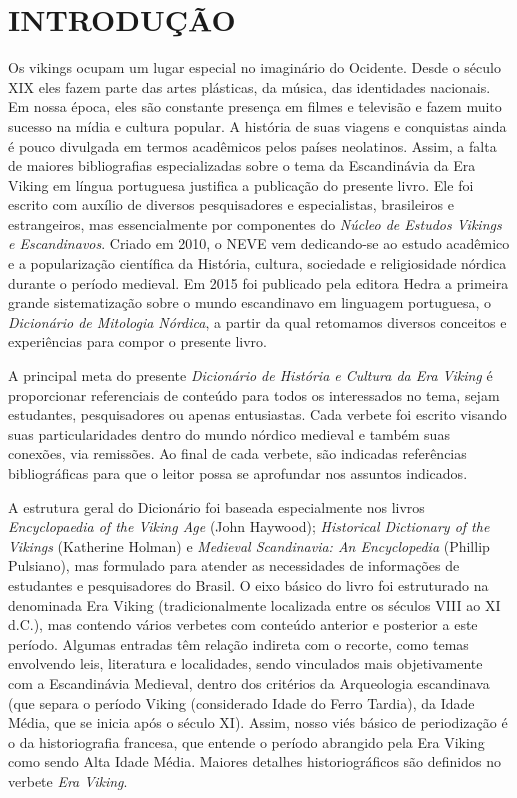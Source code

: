 


\chapter{INTRODUÇÃO}\label{introduuxe7uxe3o}

Os vikings ocupam um lugar especial no imaginário do Ocidente. Desde o
século XIX eles fazem parte das artes plásticas, da música, das
identidades nacionais. Em nossa época, eles são constante presença em
filmes e televisão e fazem muito sucesso na mídia e cultura popular. A
história de suas viagens e conquistas ainda é pouco divulgada em termos
acadêmicos pelos países neolatinos. Assim, a falta de maiores
bibliografias especializadas sobre o tema da Escandinávia da Era Viking
em língua portuguesa justifica a publicação do presente livro. Ele foi
escrito com auxílio de diversos pesquisadores e especialistas,
brasileiros e estrangeiros, mas essencialmente por componentes do
\emph{Núcleo de Estudos Vikings e Escandinavos}. Criado em 2010, o NEVE
vem dedicando-se ao estudo acadêmico e a popularização científica da
História, cultura, sociedade e religiosidade nórdica durante o período
medieval. Em 2015 foi publicado pela editora Hedra a primeira grande
sistematização sobre o mundo escandinavo em linguagem portuguesa, o
\emph{Dicionário de Mitologia Nórdica}, a partir da qual retomamos
diversos conceitos e experiências para compor o presente livro.

A principal meta do presente \emph{Dicionário de História e Cultura da
Era Viking} é proporcionar referenciais de conteúdo para todos os
interessados no tema, sejam estudantes, pesquisadores ou apenas
entusiastas. Cada verbete foi escrito visando suas particularidades
dentro do mundo nórdico medieval e também suas conexões, via remissões.
Ao final de cada verbete, são indicadas referências bibliográficas para
que o leitor possa se aprofundar nos assuntos indicados.

A estrutura geral do Dicionário foi baseada especialmente nos livros
\emph{Encyclopaedia of the Viking Age} (John Haywood); \emph{Historical
Dictionary of the Vikings} (Katherine Holman) e \emph{Medieval
Scandinavia: An Encyclopedia} (Phillip Pulsiano), mas formulado para
atender as necessidades de informações de estudantes e pesquisadores do
Brasil. O eixo básico do livro foi estruturado na denominada Era Viking
(tradicionalmente localizada entre os séculos VIII ao XI d.C.), mas
contendo vários verbetes com conteúdo anterior e posterior a este
período. Algumas entradas têm relação indireta com o recorte, como temas
envolvendo leis, literatura e localidades, sendo vinculados mais
objetivamente com a Escandinávia Medieval, dentro dos critérios da
Arqueologia escandinava (que separa o período Viking (considerado Idade
do Ferro Tardia), da Idade Média, que se inicia após o século XI).
Assim, nosso viés básico de periodização é o da historiografia francesa,
que entende o período abrangido pela Era Viking como sendo Alta Idade
Média. Maiores detalhes historiográficos são definidos no verbete
\emph{Era Viking}.

